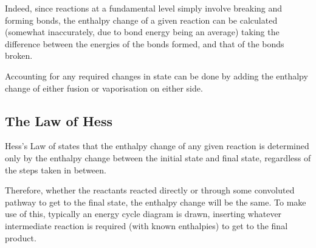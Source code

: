 
			Indeed, since reactions at a fundamental level simply involve breaking and forming bonds, the enthalpy change of a given reaction
			can be calculated (somewhat inaccurately, due to bond energy being an average) taking the difference between the energies of the
			bonds formed, and that of the bonds broken.


			Accounting for any required changes in state can be done by adding the enthalpy change of either fusion or vaporisation on either
			side.







		\pagebreak
		\subsection{The Law of Hess}

			Hess's Law of  states that the enthalpy change of any given reaction is determined only by the
			enthalpy change between the initial state and final state, regardless of the steps taken in between.

			Therefore, whether the reactants reacted directly or through some convoluted pathway to get to the final state, the enthalpy
			change will be the same. To make use of this, typically an energy cycle diagram is drawn, inserting whatever intermediate reaction
			is required (with known enthalpies) to get to the final product.


